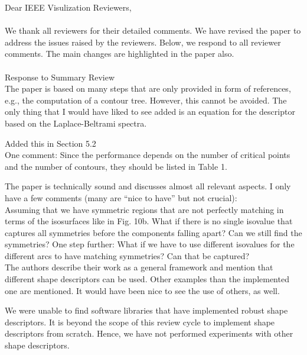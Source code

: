 \documentclass[10pt]{article}
\title{}
\date{}
\begin{document}
\noindent Dear IEEE Visulization Reviewers,\\\\

We thank all reviewers for their detailed comments. We have revised the paper to address the issues raised by the reviewers.
Below, we respond to all reviewer comments. The main changes are highlighted in the paper also.\\\\

{\noindent \LARGE Response to Summary Review}\\

The paper is based on many steps that are only provided in form of
   references, e.g., the computation of a contour tree. However, this cannot
   be avoided. The only thing that I would have liked to see added is an
   equation for the descriptor based on the Laplace-Beltrami spectra.

   {\color{blue}Added this in Section 5.2}\\

   One comment:
   Since the performance depends on the number of critical points and the
   number of contours, they should be listed in Table 1.

   The paper is technically sound and discusses almost all relevant aspects.
   I only have a few comments (many are ``nice to have'' but not crucial):\\

   Assuming that we have symmetric regions that are not perfectly matching
   in terms of the isosurfaces like in Fig. 10b. What if there is no single
   isovalue that captures all symmetries before the components falling
   apart? Can we still find the symmetries? One step further: What if we
   have to use different isovalues for the different arcs to have matching
   symmetries? Can that be captured?\\
   
   The authors describe their work as a general framework and mention that
   different shape descriptors can be used. Other examples than the
   implemented one are mentioned. It would have been nice to see the use of
   others, as well. 

   {\color{blue} We were unable to find software libraries that have implemented
	robust shape descriptors. It is beyond the scope of this review cycle
	to implement shape descriptors from scratch. Hence, we have not
performed experiments with other shape descriptors.}\\
\end{document}
